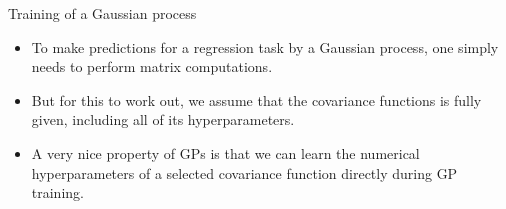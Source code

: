 \documentclass[11pt,compress,t,notes=noshow, xcolor=table]{beamer}
\begin{document}


\begin{vbframe}{Training of a Gaussian process}

\begin{itemize}
\item To make predictions for a regression task by a Gaussian process, one simply needs to perform matrix computations.
\vspace{.5cm}
\item But for this to work out, we assume that the covariance functions is fully given, including all of its hyperparameters.
\vspace{.5cm}
\item A very nice property of GPs is that we can learn the numerical hyperparameters of a selected covariance function directly during GP training.
\end{itemize}

\end{vbframe}
\end{document}
